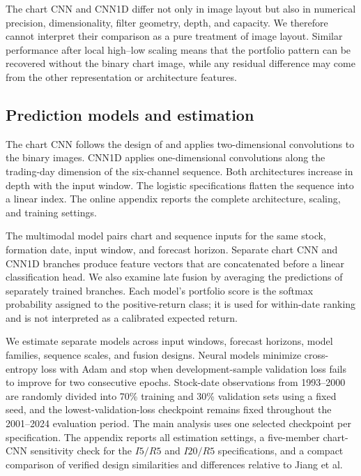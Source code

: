 The chart CNN and CNN1D differ not only in image layout but also in numerical precision, dimensionality, filter geometry, depth, and capacity. We therefore cannot interpret their comparison as a pure treatment of image layout. Similar performance after local high--low scaling means that the portfolio pattern can be recovered without the binary chart image, while any residual difference may come from the other representation or architecture features.

\subsection{Prediction models and estimation}\label{subsec:models}

The chart CNN follows the design of \textcite{reimagining_price_trends_jiang} and applies two-dimensional convolutions to the binary images. CNN1D applies one-dimensional convolutions along the trading-day dimension of the six-channel sequence. Both architectures increase in depth with the input window. The logistic specifications flatten the sequence into a linear index. The online appendix reports the complete architecture, scaling, and training settings.

The multimodal model pairs chart and sequence inputs for the same stock, formation date, input window, and forecast horizon. Separate chart CNN and CNN1D branches produce feature vectors that are concatenated before a linear classification head. We also examine late fusion by averaging the predictions of separately trained branches. Each model's portfolio score is the softmax probability assigned to the positive-return class; it is used for within-date ranking and is not interpreted as a calibrated expected return.

We estimate separate models across input windows, forecast horizons, model families, sequence scales, and fusion designs. Neural models minimize cross-entropy loss with Adam and stop when development-sample validation loss fails to improve for two consecutive epochs. Stock-date observations from 1993--2000 are randomly divided into 70\% training and 30\% validation sets using a fixed seed, and the lowest-validation-loss checkpoint remains fixed throughout the 2001--2024 evaluation period. The main analysis uses one selected checkpoint per specification. The appendix reports all estimation settings, a five-member chart-CNN sensitivity check for the $I5/R5$ and $I20/R5$ specifications, and a compact comparison of verified design similarities and differences relative to Jiang et al.

